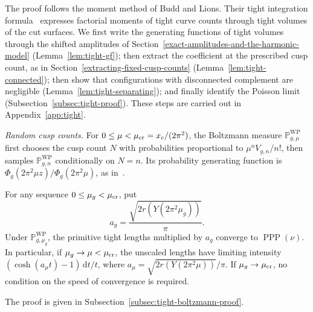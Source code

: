 The proof follows the moment method of Budd and Lions. Their tight
integration formula~\cite[Proposition~3.2]{BL} expresses factorial moments
of tight curve counts through tight volumes of the cut surfaces. We first
write the generating functions of tight volumes through the shifted
amplitudes of Section~\ref{exact-amplitudes-and-the-harmonic-model}
(Lemma~\ref{lem:tight-gf}); then extract the coefficient at the
prescribed cusp count, as in Section~\ref{extracting-fixed-cusp-counts}
(Lemma~\ref{lem:tight-connected}); then show that configurations with
disconnected complement are negligible (Lemma~\ref{lem:tight-separating});
and finally identify the Poisson limit (Subsection~\ref{subsec:tight-proof}).
These steps are carried out in Appendix~\ref{app:tight}.

\emph{Random cusp counts.}
For $0\le\mu<\mu_{\rm cr}=x_c/(2\pi^2)$, the Boltzmann measure
$\mathbb P^{\mathrm{WP}}_{g,\mu}$ first chooses the cusp count $N$
with probabilities proportional to $\mu^nV_{g,n}/n!$, then samples
$\mathbb P^{\mathrm{WP}}_{g,n}$ conditionally on $N=n$.
Its probability generating function is
$\Phi_g(2\pi^2\mu z)/\Phi_g(2\pi^2\mu)$, as in~\cite{BL}.

\begin{corollary}
\label{cor:tight-boltzmann}
For any sequence $0\le\mu_g<\mu_{\rm cr}$, put
\[
 a_g=\frac{\sqrt{2r(Y(2\pi^2\mu_g))}}\pi.
\]
Under $\mathbb P^{\mathrm{WP}}_{g,\mu_g}$, the primitive tight
lengths multiplied by $a_g$ converge to $\operatorname{PPP}(\nu)$.
In particular, if $\mu_g\to\mu<\mu_{\rm cr}$, the unscaled lengths have
limiting intensity $(\cosh(a_\mu t)-1)\,\mathrm dt/t$, where
$a_\mu=\sqrt{2r(Y(2\pi^2\mu))}/\pi$. If $\mu_g\to\mu_{\rm cr}$, no condition on
the speed of convergence is required.
\end{corollary}
\noindent The proof is given in Subsection~\ref{subsec:tight-boltzmann-proof}.
